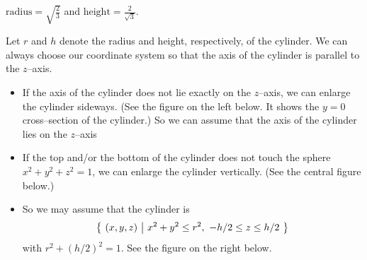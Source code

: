\begin{answer}
$\text{radius}=\sqrt{\frac{2}{3}}$
and $\text{height}=\frac{2}{\sqrt{3}}$.
\end{answer}

\begin{solution}
 Let $r$ and $h$ denote the radius and height, respectively, of the cylinder. We can always choose our coordinate system so that the axis of
the cylinder is parallel to the $z$--axis.  
\begin{itemize}
\item
If the axis of the cylinder does
not lie exactly on the $z$--axis, we can enlarge the cylinder sideways.
(See the figure on the left below. It shows the $y=0$ cross--section of
the cylinder.) So we can assume that the axis of the cylinder lies on the $z$--axis  
\item
If the top and/or the bottom of the cylinder does not touch the sphere
$x^2+y^2+z^2=1$, we can enlarge the cylinder vertically. (See the
central figure below.) 
\item
So we may assume that the cylinder is
\begin{equation*}
\big\{ \ (x,y,z)\ \big|\ x^2+y^2\le r^2,\ -h/2\le z\le h/2\ \big\}
\end{equation*}
with $r^2+(h/2)^2=1$. See the figure on the right below.
\end{itemize}


\end{solution}
